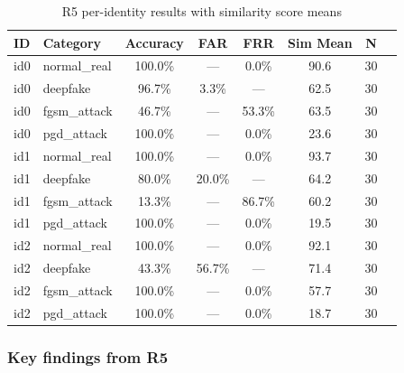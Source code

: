 \documentclass[12pt,a4paper]{article}
\begin{document}
\begin{table}[H]
\centering
\caption{R5 per-identity results with similarity score means}
\begin{tabular}{@{}llcccccc@{}}
\toprule
\textbf{ID} & \textbf{Category} & \textbf{Accuracy} & \textbf{FAR} & \textbf{FRR} & \textbf{Sim Mean} & \textbf{N} \\
\midrule
id0 & normal\_real  & 100.0\% & ---   & 0.0\%  & 90.6 & 30 \\
id0 & deepfake      & 96.7\%  & 3.3\% & ---    & 62.5 & 30 \\
id0 & fgsm\_attack  & 46.7\%  & ---   & 53.3\% & 63.5 & 30 \\
id0 & pgd\_attack   & 100.0\% & ---   & 0.0\%  & 23.6 & 30 \\
\midrule
id1 & normal\_real  & 100.0\% & ---   & 0.0\%  & 93.7 & 30 \\
id1 & deepfake      & 80.0\%  & 20.0\% & ---   & 64.2 & 30 \\
id1 & fgsm\_attack  & 13.3\%  & ---   & 86.7\% & 60.2 & 30 \\
id1 & pgd\_attack   & 100.0\% & ---   & 0.0\%  & 19.5 & 30 \\
\midrule
id2 & normal\_real  & 100.0\% & ---   & 0.0\%  & 92.1 & 30 \\
id2 & deepfake      & 43.3\%  & 56.7\% & ---   & 71.4 & 30 \\
id2 & fgsm\_attack  & 100.0\% & ---   & 0.0\%  & 57.7 & 30 \\
id2 & pgd\_attack   & 100.0\% & ---   & 0.0\%  & 18.7 & 30 \\
\bottomrule
\end{tabular}
\end{table}

\subsubsection*{Key findings from R5}
\end{document}
